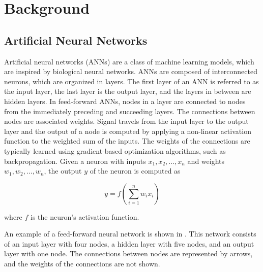 \chapter{Background}
\label{chap:background}

\section{Artificial Neural Networks}

Artificial neural networks (ANNs) are a class of machine learning models, which are inspired by biological neural networks. ANNs are composed of interconnected
neurons, which are organized in layers. The first layer of an ANN is referred to as the input layer, the last layer is the output layer, and the layers
in between are hidden layers. In feed-forward ANNs, nodes in a layer are connected to nodes from the immediately preceding and succeeding layers. The connections between nodes
are associated weights.  Signal travels from the input layer to the output layer and the output of a node is computed by applying a non-linear activation function
to the weighted sum of the inputs. The weights of the connections are typically learned using gradient-based optimization algorithms, such as backpropagation.
Given a neuron with inputs $x_1, x_2, \ldots, x_n$ and weights $w_1, w_2, \ldots, w_n$, the output $y$ of the neuron is computed as

\[
    y = f(\sum_{i=1}^{n} w_i x_i)
\]

where $f$ is the neuron's activation function.

An example of a feed-forward neural network is shown in . This network consists of an input layer with four nodes, a hidden layer with five nodes,
and an output layer with one node. The connections between nodes are represented by arrows, and the weights of the connections are not shown.

\def\layersep{2.5cm}

